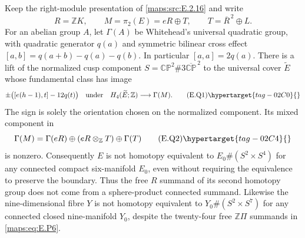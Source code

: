 \begin{proposition}\hypertarget{tag-02MI}{}\label{maps:src:E.2.18}


Keep the right-module presentation of \ref{maps:src:E.2.16} and write
\[
 R=\mathbb ZK,\qquad M=\pi_2(E)=eR\oplus T,
 \qquad T=\overline R^{\,2}\oplus L.
\]
For an abelian group $A$, let $\Gamma(A)$ be Whitehead's universal
quadratic group, with quadratic generator $q(a)$ and symmetric
bilinear cross effect
$[a,b]=q(a+b)-q(a)-q(b)$.  In particular $[a,a]=2q(a)$.
There is a lift of the normalized cusp component
$S=\mathbb {CP}^2\#3\overline{\mathbb {CP}}^{\,2}$ to the
universal cover $\widetilde E$ whose fundamental class has image
\[
 \pm\bigl([e(h-1),t]-12q(t)\bigr)
       \quad\hbox{under}\quad
 H_4(\widetilde E;\mathbb Z)\longrightarrow\Gamma(M).
 \tag{E.Q1}\hypertarget{tag-02C0}{}\label{maps:eq:E.Q1}
\]
The sign is solely the orientation chosen on the normalized
component.  Its mixed component in
\[
 \Gamma(M)=\Gamma(eR)\oplus(eR\otimes_{\mathbb Z}T)
                                      \oplus\Gamma(T)
 \tag{E.Q2}\hypertarget{tag-02C4}{}\label{maps:eq:E.Q2}
\]
is nonzero.  Consequently $E$ is not homotopy equivalent to
$E_0\#(S^2\times S^4)$ for any connected compact six-manifold
$E_0$, even without requiring the equivalence to preserve the
boundary.  Thus the free $R$ summand of its second homotopy group
does not come from a sphere-product connected summand.
Likewise the nine-dimensional fibre $Y$ is not
homotopy equivalent to $Y_0\#(S^2\times S^7)$ for any
connected closed nine-manifold $Y_0$, despite the twenty-four
free $\mathbb Z\Pi$ summands in \eqref{maps:eq:E.P6}.

\end{proposition}


